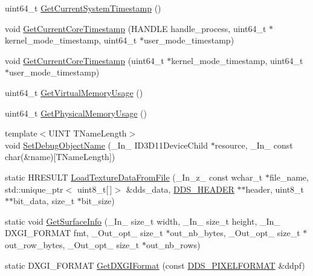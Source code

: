 \begin{DoxyCompactItemize}
\item 
uint64\+\_\+t \hyperlink{namespacemage_aeea6f9a0100878bc2403d41ea6d5ac08}{Get\+Current\+System\+Timestamp} ()
\item 
void \hyperlink{namespacemage_a1c830fb0bc11bc1f71585a4dad01c1db}{Get\+Current\+Core\+Timestamp} (H\+A\+N\+D\+LE handle\+\_\+process, uint64\+\_\+t $\ast$kernel\+\_\+mode\+\_\+timestamp, uint64\+\_\+t $\ast$user\+\_\+mode\+\_\+timestamp)
\item 
void \hyperlink{namespacemage_ab13eacb27032f7167e735b0f4f6960fc}{Get\+Current\+Core\+Timestamp} (uint64\+\_\+t $\ast$kernel\+\_\+mode\+\_\+timestamp, uint64\+\_\+t $\ast$user\+\_\+mode\+\_\+timestamp)
\item 
uint64\+\_\+t \hyperlink{namespacemage_abc4bbe41e0b34bb80ff8994ec09bd2bf}{Get\+Virtual\+Memory\+Usage} ()
\item 
uint64\+\_\+t \hyperlink{namespacemage_ad86bf56ff188b6519ddc0f0df8eaac20}{Get\+Physical\+Memory\+Usage} ()
\item 
{\footnotesize template$<$U\+I\+NT T\+Name\+Length$>$ }\\void \hyperlink{namespacemage_a88833e1a7c6ad614ff6e88cb10eff532}{Set\+Debug\+Object\+Name} (\+\_\+\+In\+\_\+ I\+D3\+D11\+Device\+Child $\ast$resource, \+\_\+\+In\+\_\+ const char(\&name)\mbox{[}T\+Name\+Length\mbox{]})
\item 
static H\+R\+E\+S\+U\+LT \hyperlink{namespacemage_ad1df9b8a27dd30528717777fd0c9c3db}{Load\+Texture\+Data\+From\+File} (\+\_\+\+In\+\_\+z\+\_\+ const wchar\+\_\+t $\ast$file\+\_\+name, std\+::unique\+\_\+ptr$<$ uint8\+\_\+t\mbox{[}$\,$\mbox{]}$>$ \&dds\+\_\+data, \hyperlink{structmage_1_1_d_d_s___h_e_a_d_e_r}{D\+D\+S\+\_\+\+H\+E\+A\+D\+ER} $\ast$$\ast$header, uint8\+\_\+t $\ast$$\ast$bit\+\_\+data, size\+\_\+t $\ast$bit\+\_\+size)
\item 
static void \hyperlink{namespacemage_a7b67bb6f38f3e787fb3561d236b88bd2}{Get\+Surface\+Info} (\+\_\+\+In\+\_\+ size\+\_\+t width, \+\_\+\+In\+\_\+ size\+\_\+t height, \+\_\+\+In\+\_\+ D\+X\+G\+I\+\_\+\+F\+O\+R\+M\+AT fmt, \+\_\+\+Out\+\_\+opt\+\_\+ size\+\_\+t $\ast$out\+\_\+nb\+\_\+bytes, \+\_\+\+Out\+\_\+opt\+\_\+ size\+\_\+t $\ast$out\+\_\+row\+\_\+bytes, \+\_\+\+Out\+\_\+opt\+\_\+ size\+\_\+t $\ast$out\+\_\+nb\+\_\+rows)
\item 
static D\+X\+G\+I\+\_\+\+F\+O\+R\+M\+AT \hyperlink{namespacemage_a4fecf9823aec7c5ba078acf6bd73f983}{Get\+D\+X\+G\+I\+Format} (const \hyperlink{structmage_1_1_d_d_s___p_i_x_e_l_f_o_r_m_a_t}{D\+D\+S\+\_\+\+P\+I\+X\+E\+L\+F\+O\+R\+M\+AT} \&ddpf)

\end{DoxyCompactItemize}
